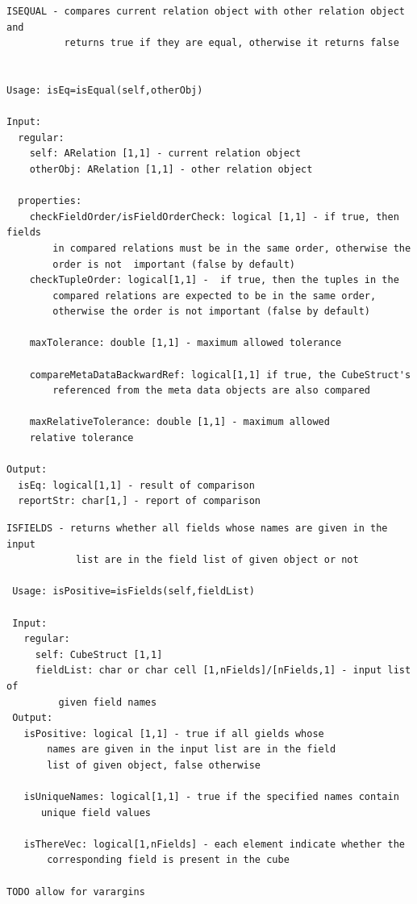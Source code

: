\documentclass[letterpaper,10pt,english]{sphinxmanual}
\begin{document}
\label{chap_func:smartdb-relations-atypifiedstaticrelation-isequal}
\begin{Verbatim}[commandchars=\\\{\}]
ISEQUAL - compares current relation object with other relation object and
          returns true if they are equal, otherwise it returns false


Usage: isEq=isEqual(self,otherObj)

Input:
  regular:
    self: ARelation [1,1] - current relation object
    otherObj: ARelation [1,1] - other relation object

  properties:
    checkFieldOrder/isFieldOrderCheck: logical [1,1] - if true, then fields
        in compared relations must be in the same order, otherwise the
        order is not  important (false by default)
    checkTupleOrder: logical[1,1] -  if true, then the tuples in the
        compared relations are expected to be in the same order,
        otherwise the order is not important (false by default)

    maxTolerance: double [1,1] - maximum allowed tolerance

    compareMetaDataBackwardRef: logical[1,1] if true, the CubeStruct's
        referenced from the meta data objects are also compared

    maxRelativeTolerance: double [1,1] - maximum allowed
    relative tolerance

Output:
  isEq: logical[1,1] - result of comparison
  reportStr: char[1,] - report of comparison
\end{Verbatim}
\label{chap_func:smartdb-relations-atypifiedstaticrelation-isfields}
\begin{Verbatim}[commandchars=\\\{\}]
 ISFIELDS - returns whether all fields whose names are given in the input
            list are in the field list of given object or not

 Usage: isPositive=isFields(self,fieldList)

 Input:
   regular:
     self: CubeStruct [1,1]
     fieldList: char or char cell [1,nFields]/[nFields,1] - input list of
         given field names
 Output:
   isPositive: logical [1,1] - true if all gields whose
       names are given in the input list are in the field
       list of given object, false otherwise

   isUniqueNames: logical[1,1] - true if the specified names contain
      unique field values

   isThereVec: logical[1,nFields] - each element indicate whether the
       corresponding field is present in the cube

TODO allow for varargins
\end{Verbatim}
\end{document}
